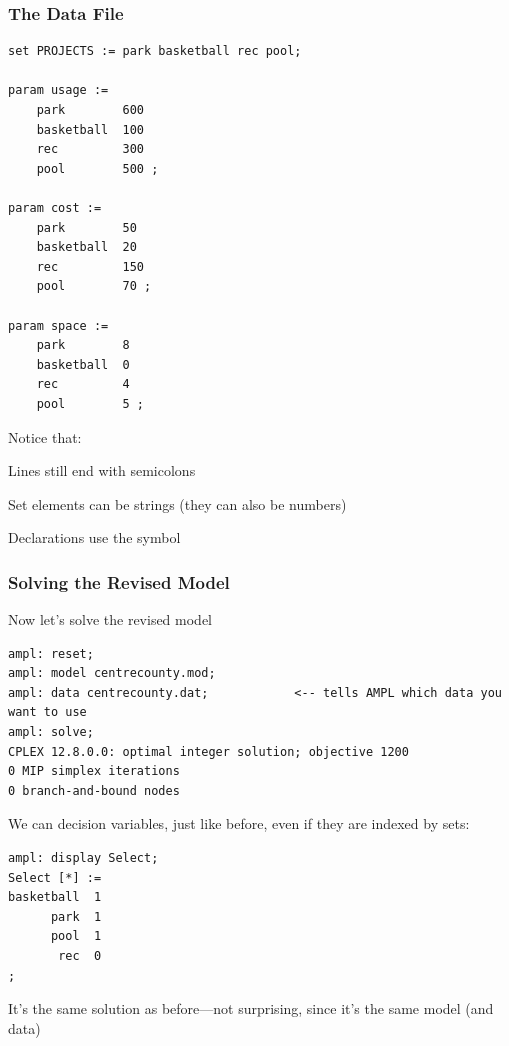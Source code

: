 \begin{frame}[fragile]

	\frametitle{The Data File}

\begin{lstlisting}
set PROJECTS := park basketball rec pool;

param usage :=
	park		600
	basketball	100
	rec			300
	pool		500 ;
	
param cost :=
	park		50
	basketball	20
	rec			150
	pool		70 ;
	
param space :=
	park		8
	basketball	0
	rec			4
	pool		5 ;
\end{lstlisting}

	\bit
	\item Notice that:
		\bit
		\item Lines still end with semicolons
		\item Set elements can be strings (they can also be numbers)
		\item Declarations use the \myinline{:=} symbol
		\eit
	\eit

\end{frame}



\begin{frame}[fragile]

	\frametitle{Solving the Revised Model}

	\bit
	\item Now let's solve the revised model
	\eit
	
\begin{lstlisting}
ampl: reset;
ampl: model centrecounty.mod;
ampl: data centrecounty.dat;			<-- tells AMPL which data you want to use
ampl: solve;
CPLEX 12.8.0.0: optimal integer solution; objective 1200
0 MIP simplex iterations
0 branch-and-bound nodes
\end{lstlisting}

	\bit
	\item We can  decision variables, just like before, even if they are indexed by sets:
	\eit
	
\begin{lstlisting}
ampl: display Select;
Select [*] :=
basketball  1
      park  1
      pool  1
       rec  0
;
\end{lstlisting}

	\bit
	\item It's the same solution as before---not surprising, since it's the same model (and data)
	\eit

\end{frame}

